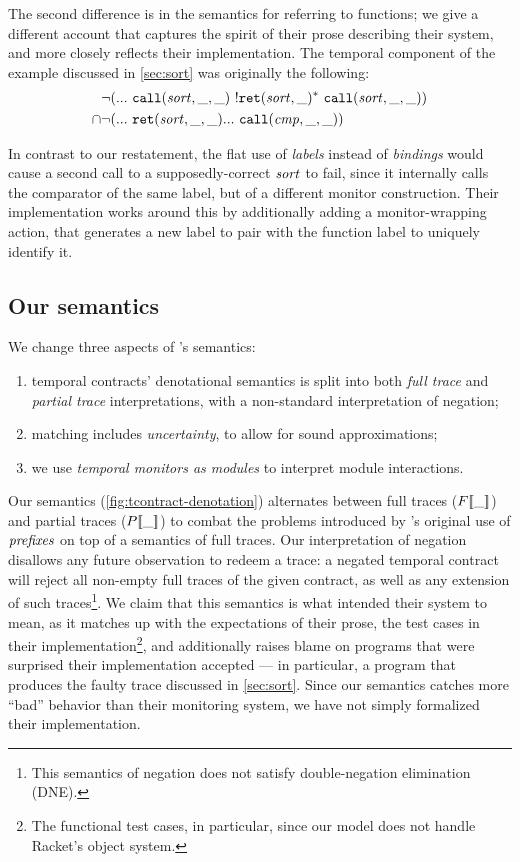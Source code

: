 The second difference is in the semantics for referring to functions; we give a different account that captures the spirit of their prose describing their system, and more closely reflects their implementation.
%
The temporal component of the example discussed in \autoref{sec:sort} was originally the following:
\begin{align*}
 &\neg ({\tt ...}~ {\tt call}(\mathit{sort},\_,\_)~ {}! {\tt ret}(\mathit{sort},\_)^*~ {\tt call}(\mathit{sort},\_,\_))
 \\ \cap& \neg ({\tt ...}~ {\tt ret}(\mathit{sort},\_,\_) {\tt ...}~ {\tt call}(\mathit{cmp},\_,\_))
\end{align*}

In contrast to our restatement, the flat use of \emph{labels} instead of \emph{bindings} would cause a second call to a supposedly-correct $\mathit{sort}$ to fail, since it internally calls the comparator of the same label, but of a different monitor construction.
%
Their implementation works around this by additionally adding a monitor-wrapping action, that generates a new label to pair with the function label to uniquely identify it.

\subsection{Our semantics}
%
We change three aspects of \dfm's semantics:
\begin{enumerate}
  \item{temporal contracts' denotational semantics is split into both \emph{full trace} and \emph{partial trace} interpretations, with a non-standard interpretation of negation;}
  \item{matching includes \emph{uncertainty}, to allow for sound approximations;}
  \item{we use \emph{temporal monitors as modules} to interpret module interactions.}
\end{enumerate}
%

%
Our semantics (\autoref{fig:tcontract-denotation}) alternates between full traces ($F[\![ \_ ]\!]$) and partial traces ($P[\![ \_ ]\!]$) to combat the problems introduced by \dfm's original use of $\mathit{prefixes}$ on top of a semantics of full traces.
%
Our interpretation of negation disallows any future observation to redeem a trace: a negated temporal contract will reject all non-empty full traces of the given contract, as well as any extension of such traces\footnote{This semantics of negation does not satisfy double-negation elimination (DNE).}.
%
We claim that this semantics is what \dfm{} intended their system to mean, as it matches up with the expectations of their prose, the test cases in their implementation\footnote{The functional test cases, in particular, since our model does not handle Racket's object system.}, and additionally raises blame on programs that \dfm{} were surprised their implementation accepted --- in particular, a program that produces the faulty trace discussed in \autoref{sec:sort}.
%
Since our semantics catches more ``bad'' behavior than their monitoring system, we have not simply formalized their implementation.

